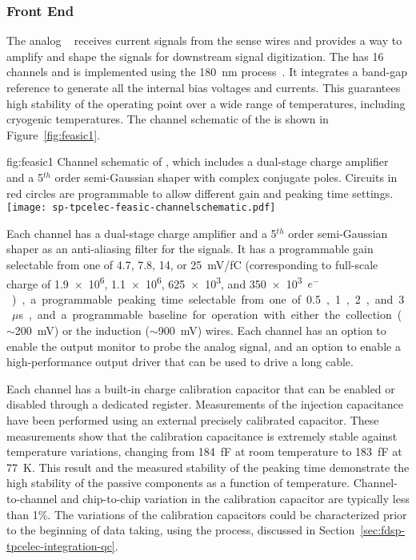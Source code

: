 \subsubsection{Front End }
\label{sec:fdsp-tpcelec-design-femb-fe}

The analog  ~\cite{DeGeronimo:2011zz} receives 
current signals from the  sense wires and provides a way to 
amplify and shape the signals for downstream signal digitization. 
The   has \num{16} channels and is implemented 
using the  \SI{180}{nm}  process~\cite{TSMC180}. It 
integrates a band-gap reference to generate all the internal bias 
voltages and currents. This guarantees high stability of the operating 
point over a wide range of temperatures, including cryogenic temperatures. 
The channel schematic of the   is shown in 
Figure~\ref{fig:feasic1}. 

\begin{dunefigure}
{fig:feasic1}
{Channel schematic of  , which includes a 
dual-stage charge amplifier and a \num{5}$^{th}$ order semi-Gaussian 
shaper with complex conjugate poles. Circuits in red circles are 
programmable to allow different gain and peaking time settings.}
\texttt{[image: sp-tpcelec-feasic-channelschematic.pdf]}
\end{dunefigure}

Each   channel has a dual-stage charge amplifier 
and a \num{5}$^{th}$ order semi-Gaussian shaper as an anti-aliasing 
filter for the  signals. It has a programmable gain 
selectable from one of \num{4.7}, \num{7.8}, \num{14}, or \SI{25}{mV/fC}
(corresponding to full-scale charge of \num{1.9e6}, \num{1.1e6}, \num{625e3}, 
and \SI{350e3}{$e^-$}), a programmable peaking time selectable from one of 
\num{0.5}, \num{1}, \num{2}, and \SI{3}{$\mu$s}, and a programmable 
baseline for operation with either the collection ($\sim$\SI{200}{mV}) 
or the induction ($\sim$\SI{900}{mV}) wires. Each channel has an 
option to enable the output monitor to probe the analog signal, and 
an option to enable a high-performance output driver that can be 
used to drive a long cable. 

Each   channel has a built-in charge calibration 
capacitor that can be enabled or disabled through a dedicated register. 
Measurements of the injection capacitance have been performed using an 
external precisely calibrated capacitor. These measurements show that
the calibration capacitance is extremely stable against temperature variations, 
changing from \SI{184}{fF} at room temperature to 
\SI{183}{fF} at \SI{77}{K}. This result and the measured stability of 
the peaking time demonstrate the high stability of the passive 
components as a function of temperature. Channel-to-channel and 
chip-to-chip variation in the calibration capacitor are typically 
less than \num{1}\%. The variations of the calibration capacitors
could be characterized prior to the beginning of 
data taking, using the  process, discussed in
Section~\ref{sec:fdsp-tpcelec-integration-qc}.

